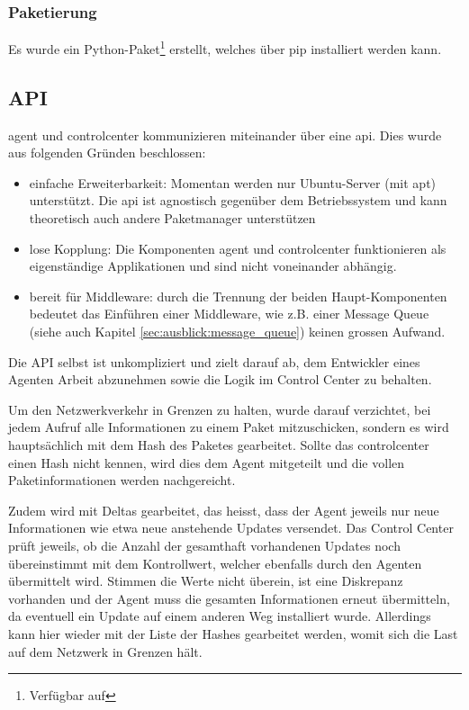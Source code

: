 \subsubsection*{Paketierung}

Es wurde ein Python-Paket\footnote{Verfügbar auf } erstellt, welches über \gls{pip} installiert werden kann.

\clearpage
\subsection*{API}
\label{sec:architecture:api}

\gls{agent} und \gls{controlcenter} kommunizieren miteinander über eine \gls{api}. Dies wurde aus folgenden Gründen beschlossen:

\begin{itemize}
    \item einfache Erweiterbarkeit: Momentan werden nur Ubuntu-Server (mit \gls{apt}) unterstützt. Die \gls{api} ist agnostisch gegenüber dem Betriebssystem und kann theoretisch auch andere Paketmanager unterstützen
    \item lose Kopplung: Die Komponenten \gls{agent} und \gls{controlcenter} funktionieren als eigenständige Applikationen und sind nicht voneinander abhängig.
    \item bereit für Middleware: durch die Trennung der beiden Haupt-Komponenten bedeutet das Einführen einer Middleware, wie z.B. einer Message Queue (siehe auch Kapitel \ref{sec:ausblick:message_queue}) keinen grossen Aufwand.
\end{itemize}

Die API selbst ist unkompliziert und zielt darauf ab, dem Entwickler eines Agenten Arbeit abzunehmen sowie die Logik im Control Center zu behalten.

Um den Netzwerkverkehr in Grenzen zu halten, wurde darauf verzichtet, bei jedem Aufruf alle Informationen zu einem Paket mitzuschicken, sondern es wird hauptsächlich mit dem Hash des Paketes gearbeitet. Sollte das \gls{controlcenter} einen Hash nicht kennen, wird dies dem Agent mitgeteilt und die vollen Paketinformationen werden nachgereicht.

Zudem wird mit Deltas gearbeitet, das heisst, dass der Agent jeweils nur neue Informationen wie etwa neue anstehende Updates versendet. Das Control Center prüft jeweils, ob die Anzahl der gesamthaft vorhandenen Updates noch übereinstimmt mit dem Kontrollwert, welcher ebenfalls durch den Agenten übermittelt wird. Stimmen die Werte nicht überein, ist eine Diskrepanz vorhanden und der Agent muss die gesamten Informationen erneut übermitteln, da eventuell ein Update auf einem anderen Weg installiert wurde. Allerdings kann hier wieder mit der Liste der Hashes gearbeitet werden, womit sich die Last auf dem Netzwerk in Grenzen hält.

